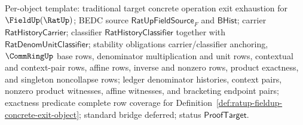Per-object template: traditional target concrete operation exit exhaustion for
$\FieldUp(\RatUp)$; BEDC source $\mathsf{RatUpFieldSource}_F$ and
$\mathsf{BHist}$; carrier $\mathsf{RatHistoryCarrier}$; classifier
$\mathsf{RatHistoryClassifier}$ together with $\mathsf{RatDenomUnitClassifier}$;
stability obligations carrier/classifier anchoring, $\CommRingUp$ base rows,
denominator multiplication and unit rows, contextual and context-pair rows,
affine rows, inverse and nonzero rows, product exactness, and singleton
noncollapse rows; ledger denominator histories, context pairs, nonzero product
witnesses, affine witnesses, and bracketing endpoint pairs; exactness predicate
complete row coverage for
Definition~\ref{def:ratup-fieldup-concrete-exit-object}; standard bridge
deferred; status $\mathsf{ProofTarget}$.
